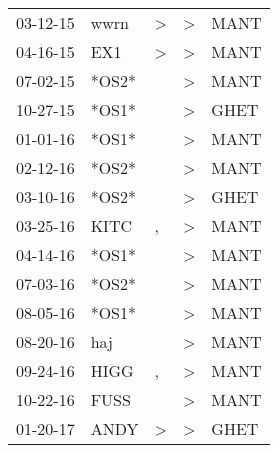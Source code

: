 \begin{supertabular}{p{0.07\textwidth}p{0.06\textwidth}p{0.02\textwidth}p{0.02\textwidth}p{0.06\textwidth}}
          03-12-15\textsuperscript{} &           wwrn\textsuperscript{} &     \textgreater &  \textgreater &           MANT\textsuperscript{} \\
          04-16-15\textsuperscript{} &            EX1\textsuperscript{} &     \textgreater &  \textgreater &           MANT\textsuperscript{} \\
          07-02-15\textsuperscript{} &                            *OS2* &                  &  \textgreater &           MANT\textsuperscript{} \\
          10-27-15\textsuperscript{} &                            *OS1* &                  &  \textgreater &           GHET\textsuperscript{} \\
          01-01-16\textsuperscript{} &                            *OS1* &                  &  \textgreater &           MANT\textsuperscript{} \\
          02-12-16\textsuperscript{} &                            *OS2* &                  &  \textgreater &           MANT\textsuperscript{} \\
          03-10-16\textsuperscript{} &                            *OS2* &                  &  \textgreater &           GHET\textsuperscript{} \\
          03-25-16\textsuperscript{} &           KITC\textsuperscript{} &                , &  \textgreater &           MANT\textsuperscript{} \\
          04-14-16\textsuperscript{} &                            *OS1* &                  &  \textgreater &           MANT\textsuperscript{} \\
          07-03-16\textsuperscript{} &                            *OS2* &                  &  \textgreater &           MANT\textsuperscript{} \\
          08-05-16\textsuperscript{} &                            *OS1* &                  &  \textgreater &           MANT\textsuperscript{} \\
          08-20-16\textsuperscript{} &            haj\textsuperscript{} &                  &  \textgreater &           MANT\textsuperscript{} \\
          09-24-16\textsuperscript{} &           HIGG\textsuperscript{} &                , &  \textgreater &           MANT\textsuperscript{} \\
          10-22-16\textsuperscript{} &           FUSS\textsuperscript{} &                  &  \textgreater &           MANT\textsuperscript{} \\
          01-20-17\textsuperscript{} &           ANDY\textsuperscript{} &     \textgreater &  \textgreater &           GHET\textsuperscript{} \\

\end{supertabular}
